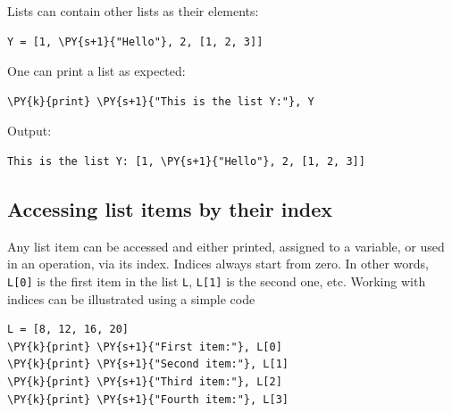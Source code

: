 \noindent
Lists can contain other lists as their elements:\\

\begin{bbox}
\begin{Verbatim}[commandchars=\\\{\}]
Y = [1, \PY{s+1}{"Hello"}, 2, [1, 2, 3]]
\end{Verbatim}
\end{bbox}
\vspace{6mm}

\noindent
One can print a list as expected:\\

\begin{bbox}
\begin{Verbatim}[commandchars=\\\{\}]
\PY{k}{print} \PY{s+1}{"This is the list Y:"}, Y
\end{Verbatim}
\end{bbox}
\vspace{6mm}

\noindent
Output:\\

\begin{ybox}
\begin{Verbatim}[commandchars=\\\{\}]
This is the list Y: [1, \PY{s+1}{"Hello"}, 2, [1, 2, 3]]
\end{Verbatim}
\end{ybox}
\vspace{6mm}

\subsection[\ \ Accessing list items by their index]{Accessing list items by their index}

\noindent
Any list item can be accessed and either printed, assigned 
to a variable, or used in an operation, via its index. Indices 
always start from zero. In other words, {\tt L[0]} is the 
first item in the list {\tt L}, {\tt L[1]} is the second one, etc. 
Working with indices can be illustrated using a simple code\\

\begin{bbox}
\begin{Verbatim}[commandchars=\\\{\}]
L = [8, 12, 16, 20]
\PY{k}{print} \PY{s+1}{"First item:"}, L[0]
\PY{k}{print} \PY{s+1}{"Second item:"}, L[1]
\PY{k}{print} \PY{s+1}{"Third item:"}, L[2]
\PY{k}{print} \PY{s+1}{"Fourth item:"}, L[3]
\end{Verbatim}
\end{bbox}
\vspace{6mm}

